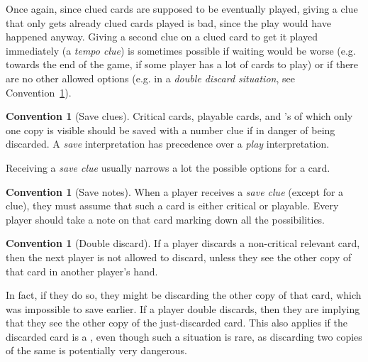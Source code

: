 \documentclass[a4paper]{article}
\theoremstyle{plain}
\theoremstyle{definition}
\newtheorem{convention}[theorem]{Convention}
\begin{document}
Once again, since clued cards are supposed to be eventually played, giving a clue that only gets already clued cards played is bad, since the play would have happened anyway. Giving a second clue on a clued card to get it played immediately (a \emph{tempo clue}) is sometimes possible if waiting would be worse (e.g. towards the end of the game, if some player has a lot of cards to play) or if there are no other allowed options (e.g. in a \emph{double discard situation}, see Convention~\ref{double-discard}).

\begin{convention}[Save clues]
	Critical cards, playable cards, and 's of which only one copy is visible should be saved with a number clue if in danger of being discarded. A \emph{save} interpretation has precedence over a \emph{play} interpretation.
\end{convention}

Receiving a \emph{save clue} usually narrows a lot the possible options for a card.

\begin{convention}[Save notes]
	\label{save-notes}
	When a player receives a \emph{save clue} (except for a  clue), they must assume that such a card is either critical or playable. Every player should take a note on that card marking down all the possibilities.
\end{convention}


\begin{convention}[Double discard]
	\label{double-discard}
	If a player discards a non-critical relevant card, then the next player is not allowed to discard, unless they see the other copy of that card in another player's hand.
\end{convention}

In fact, if they do so, they might be discarding the other copy of that card, which was impossible to save earlier. If a player double discards, then they are implying that they see the other copy of the just-discarded card. This also applies if the discarded card is a , even though such a situation is rare, as discarding two copies of the same  is potentially very dangerous. %
\end{document}
